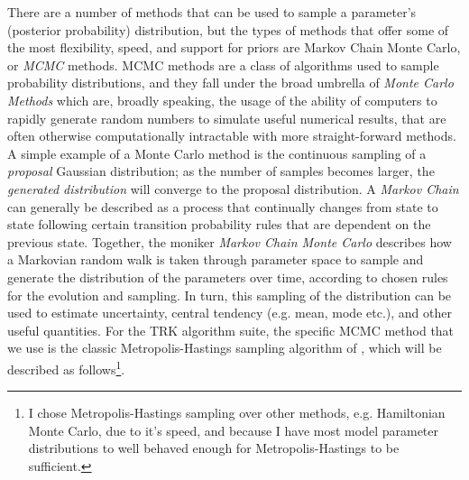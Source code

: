 There are a number of methods that can be used to sample a parameter's (posterior probability) distribution, but the types of methods that offer some of the most flexibility, speed, and support for priors are  Markov Chain Monte Carlo, or \textit{MCMC} methods. MCMC methods are a class of algorithms used to sample probability distributions, and they fall under the broad umbrella of \textit{Monte Carlo Methods} which are, broadly speaking, the usage of the ability of computers to rapidly generate random numbers to simulate useful numerical results, that are often otherwise computationally intractable with more straight-forward methods. A simple example of a Monte Carlo method is the continuous sampling of a \textit{proposal} Gaussian distribution; as the number of samples becomes larger, the \textit{generated distribution} will converge to the proposal distribution. A \textit{Markov Chain} can generally be described as a process that continually changes from state to state following certain transition probability rules that are dependent on the previous state. Together, the moniker \textit{Markov Chain Monte Carlo} describes how a Markovian random walk is taken through parameter space to sample and generate the distribution of the parameters over time, according to chosen rules for the evolution and sampling. In turn, this sampling of the distribution can be used to estimate uncertainty, central tendency (e.g. mean, mode etc.), and other useful quantities. For the TRK algorithm suite, the specific MCMC method that we use is the classic Metropolis-Hastings sampling algorithm of \textcite{hastings1970monte}, which will be described as follows\footnote{I chose Metropolis-Hastings sampling over other methods, e.g. Hamiltonian Monte Carlo, due to it's speed, and because I have most model parameter distributions to well behaved enough for Metropolis-Hastings to be sufficient.}.

